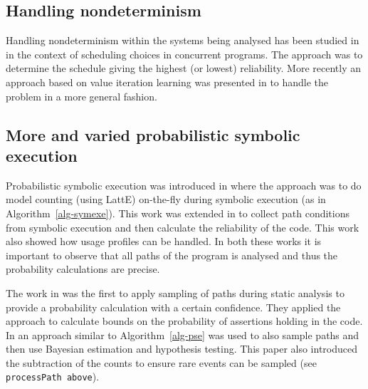 
\subsection{Handling nondeterminism}

Handling nondeterminism within the systems being analysed has been studied in \cite{filieri2013reliability} in the context of scheduling choices in concurrent programs. The approach was to determine the schedule giving the highest (or lowest) reliability. More recently an approach based on value iteration learning was presented in \cite{luckow2014exact} to handle the problem in a more general fashion.

\subsection{More and varied probabilistic symbolic execution}

Probabilistic symbolic execution was introduced in \cite{Geldenhuys2012} where the approach was to do model counting (using LattE) on-the-fly during symbolic execution (as in Algorithm~\ref{alg-symexe}). This work was extended in \cite{filieri2013reliability} to collect path conditions from symbolic execution and then calculate the reliability of the code. This work also showed how usage profiles can be handled. In both these works it is important to observe that all paths of the program is analysed and thus the probability calculations are precise. 

The work in \cite{Sankaranarayanan2013} was the first to apply sampling of paths during static analysis to provide a probability calculation with a certain confidence. They applied the approach to calculate bounds on the probability of assertions holding in the code. In \cite{Filieri2014} an approach similar to Algorithm~\ref{alg-pse} was used to also sample paths and then use Bayesian estimation and hypothesis testing. This paper also introduced the subtraction of the counts to ensure rare events can be sampled (see {\tt processPath above}). 


